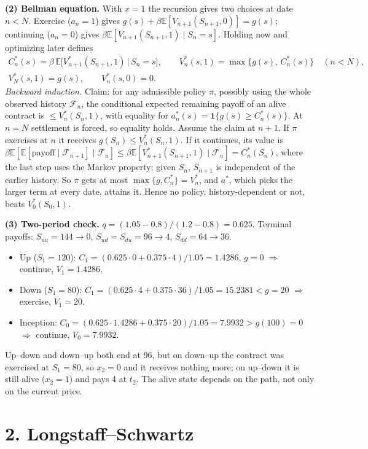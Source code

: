\documentclass[10pt]{article}
\newcommand{\E}{\mathbb{E}}
\begin{document}
\textbf{(2) Bellman equation.} With $x=1$ the recursion gives two choices at date $n<N$.
Exercise ($a_n=1$) gives $g(s)+\beta\E[V_{n+1}(S_{n+1},0)]=g(s)$; continuing ($a_n=0$) gives
$\beta\E[V_{n+1}(S_{n+1},1)\mid S_n=s]$. Holding now and optimizing later defines
\begin{gather*}
C^*_n(s)=\beta\,\E\big[V^*_{n+1}(S_{n+1},1)\,\big|\,S_n=s\big],\qquad
V^*_n(s,1)=\max\{g(s),\,C^*_n(s)\}\quad(n<N),\\
V^*_N(s,1)=g(s),\qquad V^*_n(s,0)=0 .
\end{gather*}
\emph{Backward induction.} Claim: for any admissible policy $\pi$, possibly using the whole observed
history $\mathcal F_n$, the conditional expected remaining payoff of an alive contract is
$\le V^*_n(S_n,1)$, with equality for $a^*_n(s)=\mathbf 1\{g(s)\ge C^*_n(s)\}$. At $n=N$ settlement
is forced, so equality holds. Assume the claim at $n+1$. If $\pi$ exercises at $n$ it receives
$g(S_n)\le V^*_n(S_n,1)$. If it continues, its value is
$\beta\E[\E[\text{payoff}\mid\mathcal F_{n+1}]\mid\mathcal F_n]
\le\beta\E[V^*_{n+1}(S_{n+1},1)\mid\mathcal F_n]=C^*_n(S_n)$, where the last step uses the Markov
property: given $S_n$, $S_{n+1}$ is independent of the earlier history. So $\pi$ gets at most
$\max\{g,C^*_n\}=V^*_n$, and $a^*$, which picks the larger term at every date, attains it.
Hence no policy, history-dependent or not, beats $V^*_0(S_0,1)$.

\textbf{(3) Two-period check.} $q=(1.05-0.8)/(1.2-0.8)=0.625$. Terminal payoffs:
$S_{uu}=144\to0$, $S_{ud}=S_{du}=96\to4$, $S_{dd}=64\to36$.
\begin{itemize}\itemsep0pt
\item Up ($S_1=120$): $C_1=(0.625\cdot0+0.375\cdot4)/1.05=1.4286$, $g=0$ $\Rightarrow$ continue, $V_1=1.4286$.
\item Down ($S_1=80$): $C_1=(0.625\cdot4+0.375\cdot36)/1.05=15.2381<g=20$ $\Rightarrow$ exercise, $V_1=20$.
\item Inception: $C_0=(0.625\cdot1.4286+0.375\cdot20)/1.05=7.9932>g(100)=0$ $\Rightarrow$ continue, $V_0=7.9932$.
\end{itemize}
Up--down and down--up both end at 96, but on down--up the contract was exercised at $S_1=80$, so
$x_2=0$ and it receives nothing more; on up--down it is still alive ($x_2=1$) and pays 4 at $t_2$.
The alive state depends on the path, not only on the current price.

\section*{2. Longstaff--Schwartz}
\end{document}
